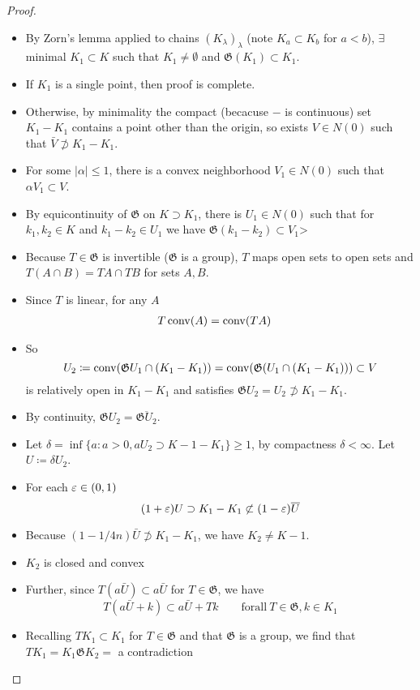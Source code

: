 \begin{proof}
  \begin{itemize}
    \item By Zorn's lemma applied to chains $(K_\lambda)_{\lambda}$ (note $K_a \subset K_b$
      for $a < b$), $\exists$ minimal $K_1 \subset K$
      such that $K_1 \neq \emptyset$ and $\mathfrak{G}(K_1) \subset K_1$.

    \item If $K_1$ is a single point, then proof is complete.
    \item Otherwise, by minimality the compact (becacuse $-$ is continuous)
      set $K_1 - K_1$ contains a point other than the origin, so
      exists $V \in N(0)$ such that $\bar{V} \not\supset K_1 - K_1$.
    \item For some $\lvert \alpha \rvert \leq 1$, there is a convex
      neighborhood $V_1 \in N(0)$ such that $\alpha V_1 \subset V$.
    \item By equicontinuity of $\mathfrak{G}$ on $K \supset K_1$, there is
      $U_1 \in N(0)$ such that for $k_1, k_2 \in K$ and
      $k_1 - k_2 \in U_1$ we have $\mathfrak{G}(k_1 - k_2) \subset V_1$>
    \item Because $T \in \mathfrak{G}$ is invertible
      ($\mathfrak{G}$ is a group), $T$ maps open sets
      to open sets and $T(A \cap B) = TA \cap TB$ for sets $A, B$.
    \item Since $T$ is linear, for any $A$
      \begin{align}
        T \operatorname{conv}(A) &= \operatorname{conv}(TA)
      \end{align}
    \item So
      \[
        U_2
        \coloneqq \operatorname{conv}(\mathfrak{G} U_1 \cap (K_1 - K_1)) \\
        = \operatorname{conv}(\mathfrak{G}(U_1 \cap (K_1 - K_1))) \subset V
      \]
      is relatively open in $K_1 - K_1$ and satisfies
      $\mathfrak{G} U_2 = U_2 \not\supset K_1 - K_1$.
    \item By continuity, $\mathfrak{G} U_2 = \overline{\mathfrak{G} U_2}$.
    \item Let $\delta = \inf \{ a : a > 0, a U_2 \supset K-1 - K_1 \} \geq 1$,
      by compactness $\delta < \infty$. Let $U \coloneqq \delta U_2$.
    \item For each $\varepsilon \in (0,1)$
      \[
        (1+\varepsilon) U \supset K_1 - K_1 \not\subset (1-\varepsilon) \overline{U}
      \]
    \item Because $(1 - 1/4n) \bar{U} \not\supset K_1 - K_1$, we have
      $K_2 \neq K-1$.
    \item $K_2$ is closed and convex
    \item Further, since $T(a \bar{U}) \subset a \bar{U}$ for $T \in
      \mathfrak{G}$, we have
      \[
        T(a\bar{U} + k)
        \subset a \bar{U} + T k
        \qquad \mathrm{for all}~T \in \mathfrak{G}, k \in K_1
      \]
    \item Recalling $T K_1 \subset K_1$ for $T \in \mathfrak{G}$
      and that $\mathfrak{G}$ is a group, we find that
      $T K_1 = K_1 \mathfrak{G} K_2 = $ 
      a contradiction
  \end{itemize}
\end{proof}

